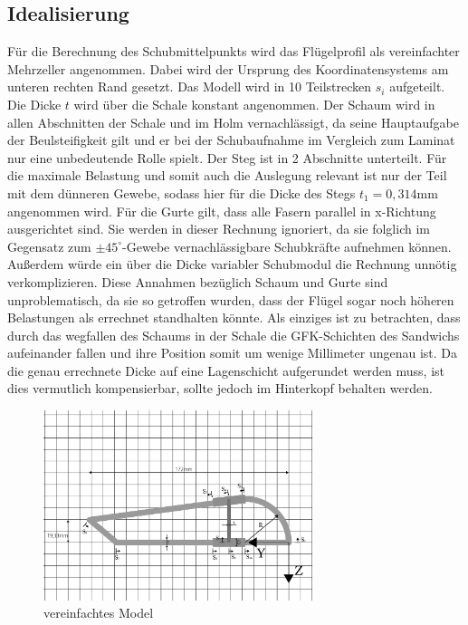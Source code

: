 \subsection{Idealisierung}
Für die Berechnung des Schubmittelpunkts wird das Flügelprofil als vereinfachter Mehrzeller angenommen.
Dabei wird der Ursprung des Koordinatensystems am unteren rechten Rand gesetzt. Das Modell wird in 10 Teilstrecken $s_{i}$ aufgeteilt. Die Dicke $t$ wird über die Schale konstant angenommen. Der Schaum wird in allen Abschnitten der Schale und im Holm vernachlässigt, da seine Hauptaufgabe der Beulsteifigkeit gilt und er bei der Schubaufnahme im Vergleich zum Laminat nur eine unbedeutende Rolle spielt. Der Steg ist in 2 Abschnitte unterteilt. Für die maximale Belastung und somit auch die Auslegung relevant ist nur der Teil mit dem dünneren Gewebe, sodass hier für die Dicke des Stegs $t_{1}=0,314\mathrm{mm}$ angenommen wird. Für die Gurte gilt, dass alle Fasern parallel in x-Richtung ausgerichtet sind. Sie werden in dieser Rechnung ignoriert, da sie folglich im Gegensatz zum $\pm45^\circ$-Gewebe vernachlässigbare Schubkräfte aufnehmen können. Außerdem würde ein über die Dicke variabler Schubmodul die Rechnung unnötig verkomplizieren.
Diese Annahmen bezüglich Schaum und Gurte sind unproblematisch, da sie so getroffen wurden, dass der Flügel sogar noch höheren Belastungen als errechnet standhalten könnte. Als einziges ist zu betrachten, dass durch das wegfallen des Schaums in der Schale die GFK-Schichten des Sandwichs aufeinander fallen und ihre Position somit um wenige Millimeter ungenau ist. Da die genau errechnete Dicke auf eine Lagenschicht aufgerundet werden muss, ist dies vermutlich kompensierbar, sollte jedoch im Hinterkopf behalten werden.
\begin{figure}[h]
 \centering
 \includegraphics[width=0.7\textwidth]{Bilder/Model1}
 \caption{vereinfachtes Model}
 \label{Fluegel1}
\end{figure}
